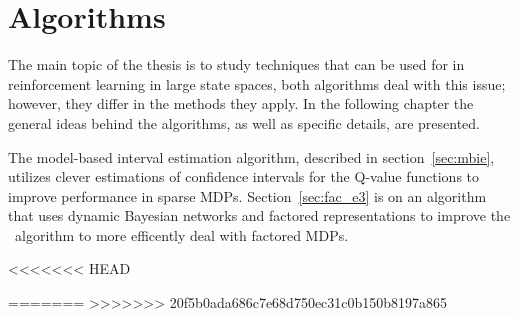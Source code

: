 \chapter{Algorithms}
\label{ch:algo}

The main topic of the thesis is to study techniques that can be used for in
reinforcement learning in large state spaces, both algorithms deal with this
issue; however, they differ in the methods they apply. In the following chapter
the general ideas behind the algorithms, as well as specific details, are
presented. 

The model-based interval estimation algorithm, described in
section~\ref{sec:mbie}, utilizes clever estimations of confidence intervals for
the Q-value functions to improve performance in sparse MDPs.
Section~\ref{sec:fac_e3} is on an algorithm that uses dynamic Bayesian networks
and factored representations to improve the \etre\ algorithm to more efficently
deal with factored MDPs. 

<<<<<<< HEAD


=======
>>>>>>> 20f5b0ada686c7e68d750ec31c0b150b8197a865

